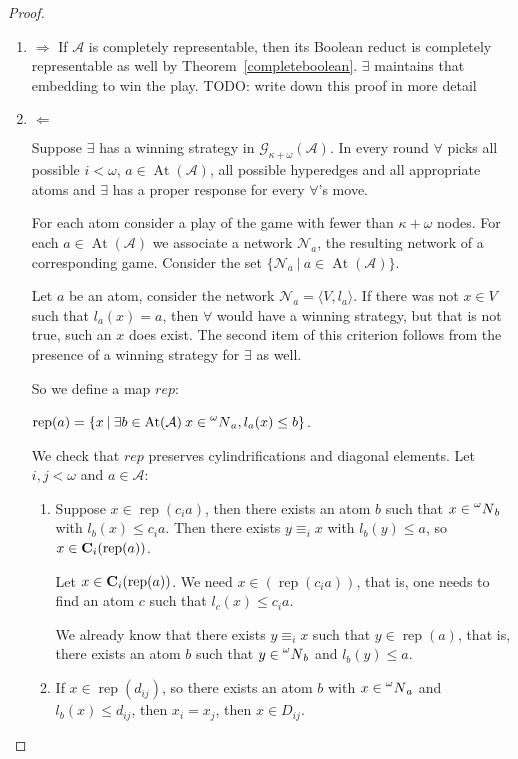 \documentclass[a4paper]{article}
\theoremstyle{defin}
\theoremstyle{theorem}
\theoremstyle{prop}
\theoremstyle{lemma}
\theoremstyle{fact}
\theoremstyle{ex}
\theoremstyle{col}
\begin{document}
\begin{proof}
  $ $

  \begin{enumerate}
    \item $\Rightarrow$
    If $\mathcal{A}$ is completely representable, then its Boolean reduct is completely representable as well by Theorem~\ref{completeboolean}. $\exists$ maintains that embedding to win the play. TODO: write down this proof in more detail

    \item $\Leftarrow$

    Suppose $\exists$ has a winning strategy in $\mathcal{G}_{\kappa + \omega}(\mathcal{A})$.
    In every round $\forall$ picks all possible $i < \omega$, $a \in \operatorname{At}(\mathcal{A})$, all possible hyperedges and all appropriate atoms and $\exists$ has a proper response for every $\forall$'s move.

    For each atom consider a play of the game with fewer than $\kappa + \omega$ nodes. For each $a \in \operatorname{At}(\mathcal{A})$ we associate a network $\mathcal{N}_a$, the resulting network of a corresponding game. Consider the set $\{ \mathcal{N}_a \: | \: a \in \operatorname{At}(\mathcal{A}) \}$.

    Let $a$ be an atom, consider the network $\mathcal{N}_a = \langle V, l_a \rangle$. If there was not $x \in V$ such that $l_a(x) = a$, then $\forall$ would have a winning strategy, but that is not true, such an $x$ does exist. The second item of this criterion follows from the presence of a winning strategy for $\exists$ as well.

    So we define a map $rep$:
    \begin{center}
    $\operatorname{rep}(a) = \{ x \: | \: \exists b \in \operatorname{At}(\mathcal{A}) \: x \in \prescript{\omega}{}N_a, l_a(x) \leq b \}$.
  \end{center}
    We check that $rep$ preserves cylindrifications and diagonal elements. Let $i, j < \omega$ and $a \in \mathcal{A}$:
    \begin{enumerate}
    \item Suppose $x \in \operatorname{rep}(c_i a)$, then there exists an atom $b$ such that $x \in \prescript{\omega}{}N_b$ with $l_b(x) \leq c_i a$. Then there exists $y \equiv_i x$ with $l_b(y) \leq a$, so $x \in {\bf C}_i(\operatorname{rep}(a))$.

    Let $x \in {\bf C}_i(\operatorname{rep}(a))$. We need $x \in (\operatorname{rep}(c_i a))$, that is, one needs to find an atom $c$ such that $l_c(x) \leq c_i a$.

    We already know that there exists $y \equiv_i x$ such that $y \in \operatorname{rep}(a)$, that is, there exists an atom $b$ such that $y \in \prescript{\omega}{}N_b$ and $l_b(y) \leq a$.

    \item If $x \in \operatorname{rep}(d_{ij})$, so there exists an atom $b$ with $x \in \prescript{\omega}{}N_a$ and $l_b(x) \leq d_{ij}$, then $x_i = x_j$, then $x \in D_{ij}$.
    \end{enumerate}
  \end{enumerate}
\end{proof}
\end{document}
